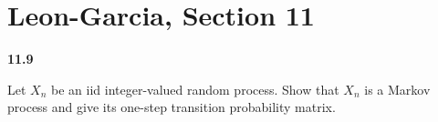 \documentclass[answers]{exam}
\begin{document}
\section{Leon-Garcia, Section 11}
\begin{questions}
    \question \textbf{11.9}

    Let $X_n$ be an iid integer-valued random process. Show that $X_n$ is a Markov process and
    give its one-step transition probability matrix.
    \begin{solution}
        
    \end{solution}
\end{questions}
\end{document}
